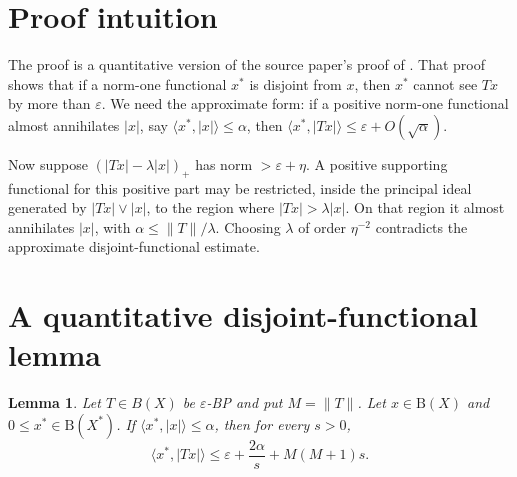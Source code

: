 \documentclass[11pt]{article}
\newtheorem{lemma}{Lemma}
\newcommand{\eps}{\varepsilon}
\newcommand{\etae}{\eta}
\newcommand{\ball}{\mathrm B}
\begin{document}
\section*{Proof intuition}

The proof is a quantitative version of the source paper's proof of
\cite[Theorem 2.10]{OT}. That proof shows that if a norm-one functional
\(x^*\) is disjoint from \(x\), then \(x^*\) cannot see \(Tx\) by more than
\(\eps\). We need the approximate form: if a positive norm-one functional
almost annihilates \(|x|\), say \(\langle x^*,|x|\rangle\le\alpha\), then
\(\langle x^*,|Tx|\rangle\le \eps+O(\sqrt{\alpha})\).

Now suppose \((|Tx|-\lambda |x|)_+\) has norm \(>\eps+\etae\). A positive
supporting functional for this positive part may be restricted, inside the
principal ideal generated by \(|Tx|\vee |x|\), to the region where
\(|Tx|>\lambda |x|\). On that region it almost annihilates \(|x|\), with
\(\alpha\le \|T\|/\lambda\). Choosing \(\lambda\) of order \(\etae^{-2}\)
contradicts the approximate disjoint-functional estimate.

\section*{A quantitative disjoint-functional lemma}

\begin{lemma}
\label{lem:approx-disjoint}
Let \(T\in B(X)\) be \(\eps\)-BP and put \(M=\|T\|\). Let
\(x\in\ball(X)\) and \(0\le x^*\in \ball(X^*)\). If
\(\langle x^*,|x|\rangle\le\alpha\), then for every \(s>0\),
\[
 \langle x^*,|Tx|\rangle
 \le \eps+\frac{2\alpha}{s}+M(M+1)s .
\]
\end{lemma}
\end{document}
